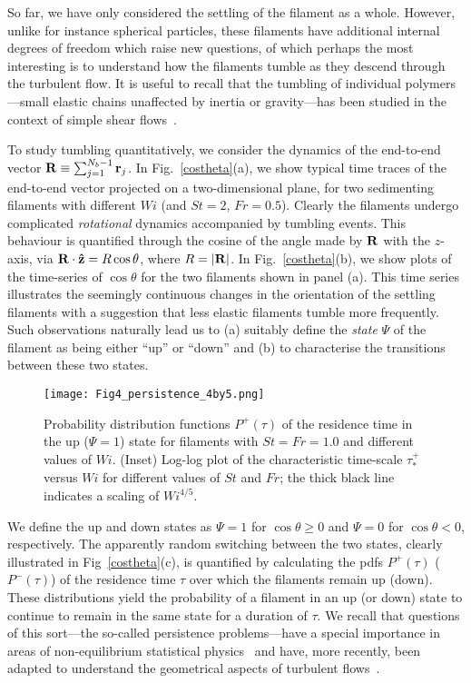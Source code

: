 \documentclass[aps,prl,twocolumn,superscriptaddress,floatfix,tightenlines,showpacs,notitlepage]{revtex4-1}
\begin{document}
So far, we have only considered the settling of the filament as a whole. 
However, unlike for instance spherical
particles, these filaments have additional internal degrees of freedom which raise new 
questions, of which perhaps the most interesting is to understand how the filaments 
tumble as they descend through the turbulent flow. It is useful to recall that the tumbling of individual polymers---small elastic chains unaffected by inertia or gravity---has been studied in the context of simple shear flows~\cite{Steinberg-Tumbling,Celani_2005}. 

To study tumbling quantitatively, we consider the dynamics of the end-to-end
vector ${\bf R} \equiv \sum_{j = 1}^{N_b -1} {\bf r}_j$.  In
Fig.~\ref{costheta}(a), we show typical time traces of the end-to-end vector projected on a
two-dimensional plane, for two sedimenting
filaments with different $Wi$ (and $St = 2$, $Fr = 0.5$). Clearly the filaments
undergo complicated \textit{rotational} dynamics accompanied by
tumbling events. This behaviour is quantified through the cosine of the angle made by
${\bf R}$ with the $z$-axis, via  ${\bf R}\cdot{\bf \hat z} = R\cos \theta$, where $R=|{\bf
R}|$. In Fig.~\ref{costheta}(b), we show plots of the
time-series of $\cos \theta$ for the two filaments shown in panel (a). This
time series illustrates the seemingly continuous changes in the orientation of
the settling filaments with a suggestion that less elastic filaments tumble more frequently. Such observations 
naturally lead us to (a) suitably define the \textit{state} $\Psi$ of the filament as being either ``up'' or ``down'' and 
(b) to characterise the transitions between these two states.



\begin{figure}
\texttt{[image: Fig4\_persistence\_4by5.png]}
	\caption{Probability distribution functions $P^+(\tau)$ of the residence time in the up ($\Psi = 1$) state for filaments with $St=Fr = 1.0$ and 
	different values of $Wi$. (Inset) Log-log plot of the characteristic time-scale $\tau_*^+$ versus $Wi$ for different values of $St$ and $Fr$; the thick black line indicates a scaling of $Wi^{4/5}$.}
\label{persistence}
\end{figure}

We define the up and 
down states as $\Psi = 1$ for $\cos\theta \geq 0$ and $\Psi = 0$ for $\cos\theta
< 0$, respectively. The apparently random
switching between the two states, clearly illustrated in Fig~\ref{costheta}(c), is quantified 
by calculating the pdfs $P^+ (\tau)$ ($P^- (\tau)$) of the residence time 
$\tau$ over which the filaments remain up (down). These distributions 
yield the probability of a filament in an 
up (or down) state to continue to remain in the same state for a duration of $\tau$.
We recall that questions of this sort---the so-called persistence problems---have a
special importance in areas of non-equilibrium statistical physics~\cite{Satya,Derrida,Satya-Review,Bray} and have,
more recently, been adapted to understand the geometrical aspects of turbulent
flows~\cite{Prasad,Bos,Akshay}.  
\end{document}
